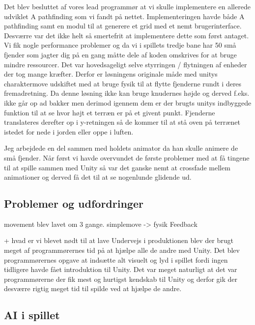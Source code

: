 Det blev besluttet af vores lead programmør at vi skulle implementere en allerede udviklet A\* pathfinding som vi fandt på nettet. Implementeringen havde både A\* pathfinding samt en modul til at generere et grid med et nemt brugerinterface. Desværre var det ikke helt så smertefrit at implementere dette som først antaget. Vi fik nogle performance problemer og da vi i spillets tredje bane har 50 små fjender som jagter dig på en gang måtte dele af koden omskrives for at bruge mindre ressourcer. Det var hovedsageligt selve styrringen / flytningen af enheder der tog mange kræfter. Derfor er løsningens originale måde med unitys charaktermove udskiftet med at bruge fysik til at flytte fjenderne rundt i deres fremadretning. Da denne løsning ikke kan bruge knudernes højde og derved f.eks. ikke går op ad bakker men derimod igennem dem er der brugts unitys indbyggede funktion til at se hvor højt et terræn er på et givent punkt. Fjenderne translateres derefter op i y-retningen så de kommer til at stå oven på terrænet istedet for nede i jorden eller oppe i luften.

Jeg arbejdede en del sammen med holdets animator da han skulle animere de små fjender. Når først vi havde overvundet de første problemer med at få tingene til at spille sammen med Unity så var det ganske nemt at crossfade mellem animationer og derved få det til at se nogenlunde glidende ud.  

\subsection{Problemer og udfordringer}



movement blev lavet om 3 gange.
simplemove -> fysik
Feedback

                + hvad er vi blevet nødt til at lave
Undervejs i produktionen blev der brugt meget af programmørernes tid på at hjælpe alle de andre med Unity. Det blev programmørernes opgave at indsætte alt visuelt og lyd i spillet fordi ingen tidligere havde fået introduktion til Unity. Det var meget naturligt at det var programmørerne der fik mest og hurtigst kendskab til Unity og derfor gik der desværre rigtig meget tid til spilde ved at hjælpe de andre.

\subsection{AI i spillet}

